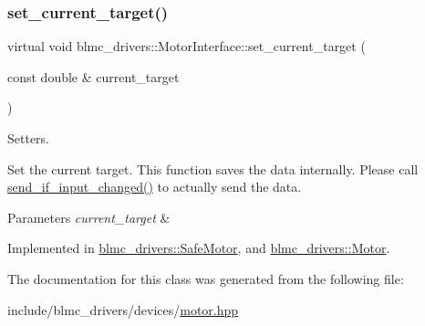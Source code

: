 \subsubsection{\texorpdfstring{set\+\_\+current\+\_\+target()}{set\_current\_target()}}
{\footnotesize\ttfamily virtual void blmc\+\_\+drivers\+::\+Motor\+Interface\+::set\+\_\+current\+\_\+target (\begin{DoxyParamCaption}\item[{const double \&}]{current\+\_\+target }\end{DoxyParamCaption})\hspace{0.3cm}{\ttfamily [pure virtual]}}



Setters. 

Set the current target. This function saves the data internally. Please call \hyperlink{classblmc__drivers_1_1MotorInterface_a7ac16ddd18d76781612714a485dcb6bd}{send\+\_\+if\+\_\+input\+\_\+changed()} to actually send the data.


\begin{DoxyParams}{Parameters}
{\em current\+\_\+target} & \\
\hline
\end{DoxyParams}


Implemented in \hyperlink{classblmc__drivers_1_1SafeMotor_adedaee24408b94b3d1ed8f856e218b12}{blmc\+\_\+drivers\+::\+Safe\+Motor}, and \hyperlink{classblmc__drivers_1_1Motor_a48801c9858a7b1784b0a0ac4272fdaf5}{blmc\+\_\+drivers\+::\+Motor}.



The documentation for this class was generated from the following file\+:\begin{DoxyCompactItemize}
\item 
include/blmc\+\_\+drivers/devices/\hyperlink{motor_8hpp}{motor.\+hpp}\end{DoxyCompactItemize}
